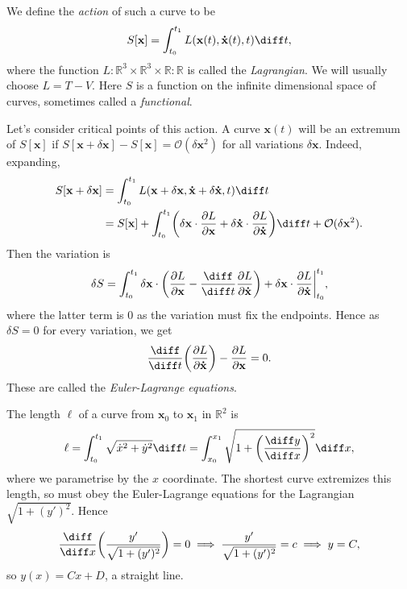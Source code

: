 \documentclass[12pt]{article}
\begin{document}
We define the \emph{action} of such a curve to be
\[
	S[\mathbf{x}] = \int_{t_0}^{t_1} L(\mathbf{x}(t), \mathbf{\dot x}(t), t) \diff t,
\]
where the function $L : \mathbb{R}^3 \times \mathbb{R}^3 \times \mathbb{R} : \mathbb{R}$ is called the \emph{Lagrangian}. We will usually choose $L = T - V$. Here $S$ is a function on the infinite dimensional space of curves, sometimes called a \emph{functional}.

Let's consider critical points of this action. A curve $\mathbf{x}(t)$ will  be an extremum of $S[\mathbf{x}]$ if $S[\mathbf{x}+\delta \mathbf{x}] - S[\mathbf{x}] = \mathcal{O}(\delta \mathbf{x}^2)$ for all variations $\delta \mathbf{x}$. Indeed, expanding,
\begin{align*}
	S[\mathbf{x} + \delta \mathbf{x}] &= \int_{t_0}^{t_1} L(\mathbf{x} + \delta \mathbf{x}, \mathbf{\dot x} + \delta \mathbf{\dot x}, t) \diff t \\
					  &= S[\mathbf{x}] + \int_{t_0}^{t_1} \biggl( \delta \mathbf{x} \cdot \frac{\partial L}{\partial \mathbf{x}} + \delta \mathbf{\dot x} \cdot \frac{\partial L}{\partial \mathbf{\dot x}} \biggr) \diff t + \mathcal{O}(\delta \mathbf{x}^2).
\end{align*}
Then the variation is
\[
\delta S = \int_{t_0}^{t_1} \delta \mathbf{x} \cdot \biggl( \frac{\partial L}{\partial \mathbf{x}} - \frac{\diff}{\diff t} \frac{\partial L}{\partial \mathbf{\dot x}} \biggr) + \delta \mathbf{x} \cdot \frac{\partial L}{\partial \mathbf{\dot x}} \biggr|_{t_0}^{t_1},
\]
where the latter term is 0 as the variation must fix the endpoints. Hence as $\delta S = 0$ for every variation, we get
\[
\frac{\diff}{\diff t} \biggl( \frac{\partial L }{\partial \mathbf{\dot x}} \biggr) - \frac{\partial L}{\partial \mathbf{x}} = 0.
\]
These are called the \emph{Euler-Lagrange equations}.

\begin{exbox}
	The length $\ell$ of a curve from $\mathbf{x}_0$ to $\mathbf{x}_1$ in $\mathbb{R}^2$ is
	\[
		\ell = \int_{t_0}^{t_1} \sqrt{\dot x^2 + \dot y^2} \diff t = \int_{x_0}^{x_1} \sqrt{1 + \biggl( \frac{\diff y}{\diff x} \biggr)^2} \diff x,
	\]
where we parametrise by the $x$ coordinate. The shortest curve extremizes this length, so must obey the Euler-Lagrange equations for the Lagrangian $\sqrt{1+(y')^2}$. Hence
\[
	\frac{\diff}{\diff x} \biggl( \frac{y'}{\sqrt{1 + (y')^2}} \biggr) = 0 \implies \frac{y'}{\sqrt{1 + (y')^2}} = c \implies y = C,
\]
so $y(x) = Cx + D$, a straight line.
\end{exbox}
\end{document}
